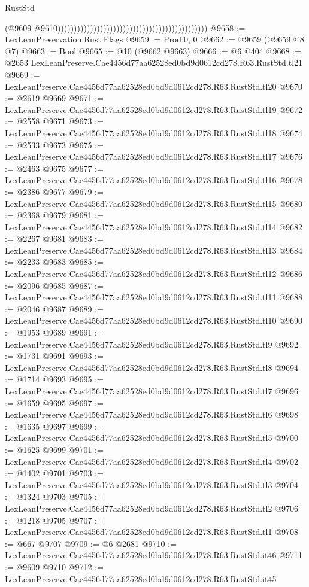 \begin{lexlean}{RustStd}
\begin{coremodule}
                                                                                              (@9609
                                                                                                @9610))))))))))))))))))))))))))))))))))))))))))))))
@9658 := LexLeanPreservation.Rust.Flags
@9659 := Prod.{0, 0}
@9662 := @9659 (@9659 @8 @7)
@9663 := Bool
@9665 := @10 (@9662 @9663)
@9666 := @6 @404
@9668 := @2653 LexLeanPreserve.Cae4456d77aa62528ed0bd9d0612cd278.R63.RustStd.tl21
@9669 := LexLeanPreserve.Cae4456d77aa62528ed0bd9d0612cd278.R63.RustStd.tl20
@9670 := @2619 @9669
@9671 := LexLeanPreserve.Cae4456d77aa62528ed0bd9d0612cd278.R63.RustStd.tl19
@9672 := @2558 @9671
@9673 := LexLeanPreserve.Cae4456d77aa62528ed0bd9d0612cd278.R63.RustStd.tl18
@9674 := @2533 @9673
@9675 := LexLeanPreserve.Cae4456d77aa62528ed0bd9d0612cd278.R63.RustStd.tl17
@9676 := @2463 @9675
@9677 := LexLeanPreserve.Cae4456d77aa62528ed0bd9d0612cd278.R63.RustStd.tl16
@9678 := @2386 @9677
@9679 := LexLeanPreserve.Cae4456d77aa62528ed0bd9d0612cd278.R63.RustStd.tl15
@9680 := @2368 @9679
@9681 := LexLeanPreserve.Cae4456d77aa62528ed0bd9d0612cd278.R63.RustStd.tl14
@9682 := @2267 @9681
@9683 := LexLeanPreserve.Cae4456d77aa62528ed0bd9d0612cd278.R63.RustStd.tl13
@9684 := @2233 @9683
@9685 := LexLeanPreserve.Cae4456d77aa62528ed0bd9d0612cd278.R63.RustStd.tl12
@9686 := @2096 @9685
@9687 := LexLeanPreserve.Cae4456d77aa62528ed0bd9d0612cd278.R63.RustStd.tl11
@9688 := @2046 @9687
@9689 := LexLeanPreserve.Cae4456d77aa62528ed0bd9d0612cd278.R63.RustStd.tl10
@9690 := @1953 @9689
@9691 := LexLeanPreserve.Cae4456d77aa62528ed0bd9d0612cd278.R63.RustStd.tl9
@9692 := @1731 @9691
@9693 := LexLeanPreserve.Cae4456d77aa62528ed0bd9d0612cd278.R63.RustStd.tl8
@9694 := @1714 @9693
@9695 := LexLeanPreserve.Cae4456d77aa62528ed0bd9d0612cd278.R63.RustStd.tl7
@9696 := @1659 @9695
@9697 := LexLeanPreserve.Cae4456d77aa62528ed0bd9d0612cd278.R63.RustStd.tl6
@9698 := @1635 @9697
@9699 := LexLeanPreserve.Cae4456d77aa62528ed0bd9d0612cd278.R63.RustStd.tl5
@9700 := @1625 @9699
@9701 := LexLeanPreserve.Cae4456d77aa62528ed0bd9d0612cd278.R63.RustStd.tl4
@9702 := @1402 @9701
@9703 := LexLeanPreserve.Cae4456d77aa62528ed0bd9d0612cd278.R63.RustStd.tl3
@9704 := @1324 @9703
@9705 := LexLeanPreserve.Cae4456d77aa62528ed0bd9d0612cd278.R63.RustStd.tl2
@9706 := @1218 @9705
@9707 := LexLeanPreserve.Cae4456d77aa62528ed0bd9d0612cd278.R63.RustStd.tl1
@9708 := @667 @9707
@9709 := @6 @2681
@9710 := LexLeanPreserve.Cae4456d77aa62528ed0bd9d0612cd278.R63.RustStd.it46
@9711 := @9609 @9710
@9712 := LexLeanPreserve.Cae4456d77aa62528ed0bd9d0612cd278.R63.RustStd.it45

\end{coremodule}
\end{lexlean}
